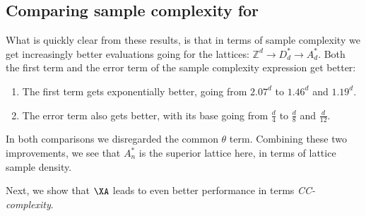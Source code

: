 \subsection*{Comparing sample complexity for \Lattices}
    What is quickly clear from these results, is that in terms of sample complexity we get increasingly better evaluations going for the lattices: $\mathbb{Z}^d\rightarrow D_d^*\rightarrow A_d^*$. Both the first term and the error term of the sample complexity expression get better: 
    \begin{enumerate}
        \item The first term gets exponentially better, going from $2.07^d$ to $1.46^d$ and $1.19^d$.
        \item The error term also gets better, with its base going from $\frac{d}{4}$ to $\frac{d}{8}$ and $\frac{d}{12}$. 
    \end{enumerate}
    In both comparisons we disregarded the common $\theta$ term.
    Combining these two improvements, we see that $A_n^*$ is the superior lattice here, in terms of lattice sample density.


    Next, we show that $\XA$ leads to even better performance in terms \emph{CC-complexity}.



